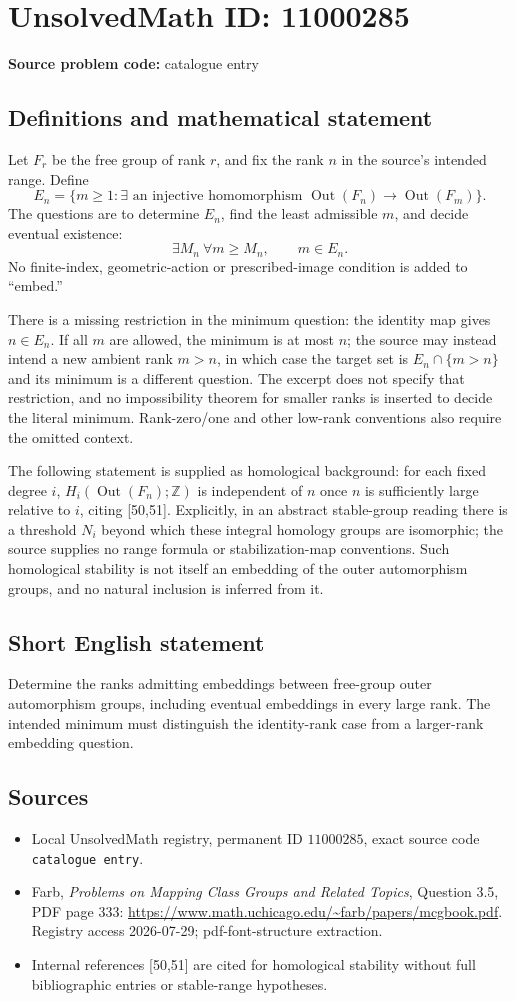 \documentclass[11pt]{article}
\newcommand{\Z}{\mathbb{Z}}
\begin{document}
\section*{UnsolvedMath ID: 11000285}
\textbf{Source problem code:} catalogue entry
\subsection{Definitions and mathematical statement}
Let \(F_r\) be the free group of rank \(r\), and fix the rank \(n\) in the source's intended range. Define
\[E_n=\{m\geq1:\exists\text{ an injective homomorphism }\operatorname{Out}(F_n)\to\operatorname{Out}(F_m)\}.\]
The questions are to determine \(E_n\), find the least admissible \(m\), and decide eventual existence:
\[\exists M_n\ \forall m\geq M_n,\qquad m\in E_n.\]
No finite-index, geometric-action or prescribed-image condition is added to ``embed.''

There is a missing restriction in the minimum question: the identity map gives \(n\in E_n\). If all \(m\) are allowed, the minimum is at most \(n\); the source may instead intend a new ambient rank \(m>n\), in which case the target set is \(E_n\cap\{m>n\}\) and its minimum is a different question. The excerpt does not specify that restriction, and no impossibility theorem for smaller ranks is inserted to decide the literal minimum. Rank-zero/one and other low-rank conventions also require the omitted context.

The following statement is supplied as homological background: for each fixed degree \(i\), \(H_i(\operatorname{Out}(F_n);\Z)\) is independent of \(n\) once \(n\) is sufficiently large relative to \(i\), citing [50,51]. Explicitly, in an abstract stable-group reading there is a threshold \(N_i\) beyond which these integral homology groups are isomorphic; the source supplies no range formula or stabilization-map conventions. Such homological stability is not itself an embedding of the outer automorphism groups, and no natural inclusion is inferred from it.
\subsection{Short English statement}
Determine the ranks admitting embeddings between free-group outer automorphism groups, including eventual embeddings in every large rank. The intended minimum must distinguish the identity-rank case from a larger-rank embedding question.
\subsection{Sources}
\begin{itemize}
\item Local UnsolvedMath registry, permanent ID \(11000285\), exact source code \texttt{catalogue entry}.
\item Farb, \emph{Problems on Mapping Class Groups and Related Topics}, Question 3.5, PDF page 333: \url{https://www.math.uchicago.edu/~farb/papers/mcgbook.pdf}. Registry access 2026-07-29; pdf-font-structure extraction.
\item Internal references [50,51] are cited for homological stability without full bibliographic entries or stable-range hypotheses.
\end{itemize}
\end{document}

